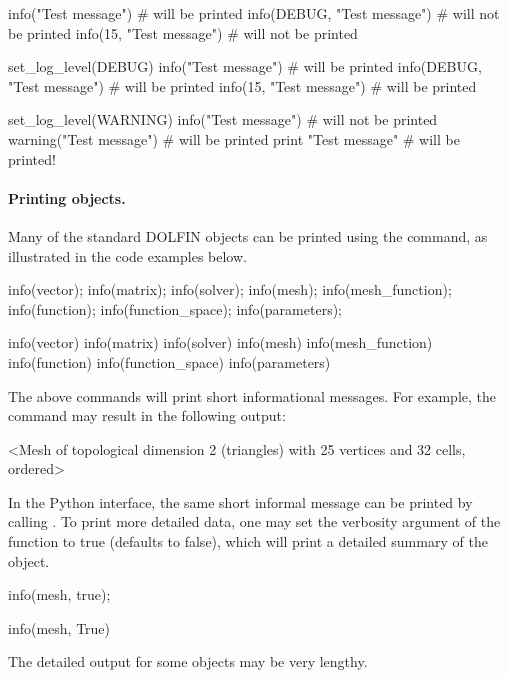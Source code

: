 \begin{python}
info("Test message")                       # will be printed
info(DEBUG, "Test message")                # will not be printed
info(15, "Test message")                   # will not be printed

set_log_level(DEBUG)
info("Test message")                       # will be printed
info(DEBUG, "Test message")                # will be printed
info(15, "Test message")                   # will be printed

set_log_level(WARNING)
info("Test message")                       # will not be printed
warning("Test message")                    # will be printed
print "Test message"                       # will be printed!
\end{python}


\paragraph{Printing objects.}

Many of the standard DOLFIN objects can be printed using the 
command, as illustrated in the code examples below.
\begin{c++}
info(vector);
info(matrix);
info(solver);
info(mesh);
info(mesh_function);
info(function);
info(function_space);
info(parameters);
\end{c++}
\begin{python}
info(vector)
info(matrix)
info(solver)
info(mesh)
info(mesh_function)
info(function)
info(function_space)
info(parameters)
\end{python}
The above commands will print short informational messages. For example,
the command  may result in the following output:
\begin{gencode}
<Mesh of topological dimension 2 (triangles) with 25 vertices and 32 cells, ordered>
\end{gencode}
In the Python interface, the same short informal message can be printed
by calling . To print more detailed data, one may
set the verbosity argument of the  function to true (defaults
to false), which will print a detailed summary of the object.
\begin{c++}
info(mesh, true);
\end{c++}
\begin{python}
info(mesh, True)
\end{python}
The detailed output for some objects may be very lengthy.


